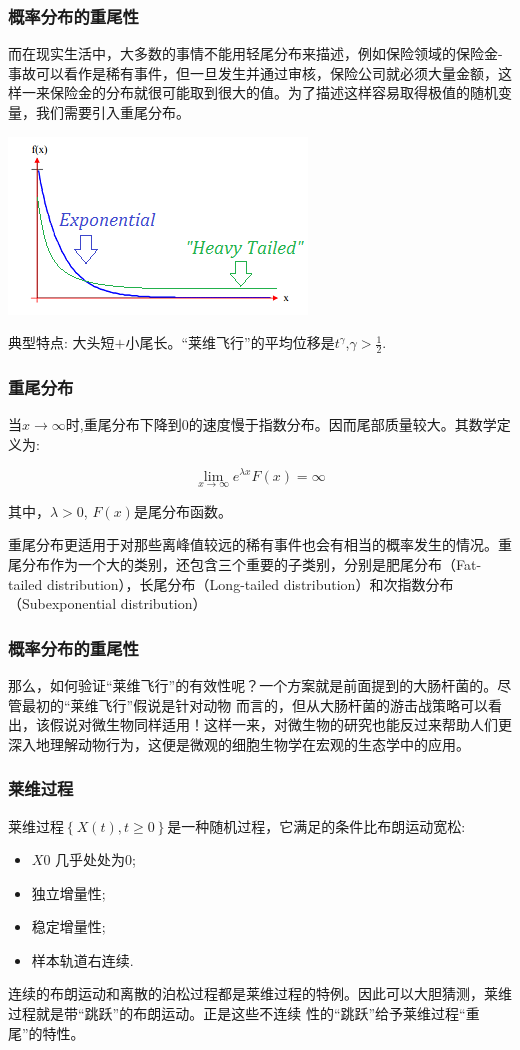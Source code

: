 \documentclass{beamer}
\begin{document}
\begin{frame}

\frametitle{概率分布的重尾性}
\qquad 而在现实生活中，大多数的事情不能用轻尾分布来描述，例如保险领域的保险金-事故可以看作是稀有事件，但一旦发生并通过审核，保险公司就必须大量金额，这样一来保险金的分布就很可能取到很大的值。为了描述这样容易取得极值的随机变量，我们需要引入重尾分布。

\centering\includegraphics[scale=0.5]{image/heavy_tailed.png}

典型特点: 大头短$+$小尾长。“莱维飞行”的平均位移是$t^{\gamma}$,$\gamma>\frac{1}{2}$.
\end{frame}
\begin{frame}
\frametitle{重尾分布}
当$x\rightarrow \infty$时,重尾分布下降到$0$的速度慢于指数分布。因而尾部质量较大。其数学定义为:

\begin{displaymath}
\lim_{x\rightarrow \infty }e^{\lambda x}F\left ( x \right )=\infty
\end{displaymath}

其中，$\lambda>0$, $F(x)$是尾分布函数。

重尾分布更适用于对那些离峰值较远的稀有事件也会有相当的概率发生的情况。重尾分布作为一个大的类别，还包含三个重要的子类别，分别是肥尾分布（Fat-tailed distribution），长尾分布（Long-tailed distribution）和次指数分布（Subexponential distribution）
\end{frame}

\begin{frame}

\frametitle{概率分布的重尾性}
\qquad 那么，如何验证“莱维飞行”的有效性呢？一个方案就是前面提到的大肠杆菌的{\color{red}{趋化行为}}。尽管最初的“莱维飞行”假说是针对动物
而言的，但从大肠杆菌的游击战策略可以看出，该假说对微生物同样适用！这样一来，对微生物的研究也能反过来帮助人们更深入地理解动物行为，这便是微观的细胞生物学在宏观的生态学中的应用。

\end{frame}

\begin{frame}
\frametitle{莱维过程}
\qquad 莱维过程$\left \{ X\left ( t \right ),t\geq 0 \right \}$是一种随机过程，它满足的条件比布朗运动宽松:
\begin{itemize}
\item $X{0}$ 几乎处处为0;
\item 独立增量性;
\item 稳定增量性;
\item 样本轨道右连续.
\end{itemize}


\qquad 连续的布朗运动和离散的泊松过程都是莱维过程的特例。因此可以大胆猜测，莱维过程就是带“跳跃”的布朗运动。正是这些不连续
性的“跳跃”给予莱维过程“重尾”的特性。
\end{frame}
	
\end{document}
